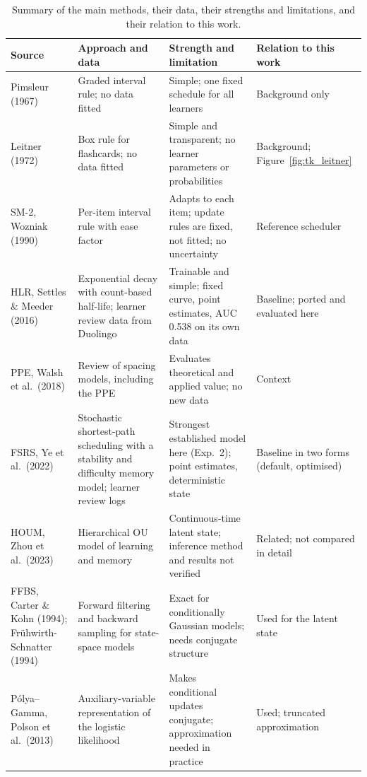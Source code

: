 \begin{table}[htbp]
  \centering
  \footnotesize\setlength{\tabcolsep}{4pt}
  \caption{Summary of the main methods, their data, their strengths and limitations, and their relation to this work.}
  \label{tab:lit_summary}
  \footnotesize
  \begin{tabular}{@{}>{\raggedright\arraybackslash}p{2.5cm}>{\raggedright\arraybackslash}p{3.5cm}>{\raggedright\arraybackslash}p{3.8cm}>{\raggedright\arraybackslash}p{3.0cm}@{}}
    \toprule
    Source & Approach and data & Strength and limitation & Relation to this work \\
    \midrule
    Pimsleur (1967) & Graded interval rule; no data fitted & Simple; one fixed schedule for all learners & Background only \\
    Leitner (1972) & Box rule for flashcards; no data fitted & Simple and transparent; no learner parameters or probabilities & Background; Figure~\ref{fig:tk_leitner} \\
    SM-2, Wozniak (1990) & Per-item interval rule with ease factor & Adapts to each item; update rules are fixed, not fitted; no uncertainty & Reference scheduler \\
    HLR, Settles \& Meeder (2016) & Exponential decay with count-based half-life; learner review data from Duolingo & Trainable and simple; fixed curve, point estimates, AUC 0.538 on its own data & Baseline; ported and evaluated here \\
    PPE, Walsh et al.\ (2018) & Review of spacing models, including the PPE & Evaluates theoretical and applied value; no new data & Context \\
    FSRS, Ye et al.\ (2022) & Stochastic shortest-path scheduling with a stability and difficulty memory model; learner review logs & Strongest established model here (Exp.\ 2); point estimates, deterministic state & Baseline in two forms (default, optimised) \\
    HOUM, Zhou et al.\ (2023) & Hierarchical OU model of learning and memory & Continuous-time latent state; inference method and results not verified & Related; not compared in detail \\
    FFBS, Carter \& Kohn (1994); Fr\"uhwirth-Schnatter (1994) & Forward filtering and backward sampling for state-space models & Exact for conditionally Gaussian models; needs conjugate structure & Used for the latent state \\
    P\'olya--Gamma, Polson et al.\ (2013) & Auxiliary-variable representation of the logistic likelihood & Makes conditional updates conjugate; approximation needed in practice & Used; truncated approximation \\
    \bottomrule
  \end{tabular}
\end{table}

